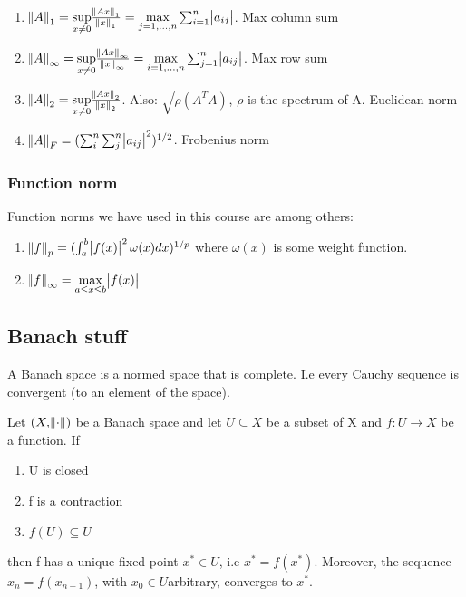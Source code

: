 \documentclass[a4paper, 12pt]{article}
\begin{document}
\begin{myex}
	\begin{enumerate}
		\item $\norm{A}_1 = \underset{x \neq 0}{\sup} \frac{\norm{Ax}_1}{\norm{x}_1} = \underset{j=1,...,n}{\max} \sum_{i=1}^{n}\abs{a_{ij}}$. Max column sum
		\item $\norm{A}_\infty = \underset{x \neq 0}{\sup} \frac{\norm{Ax}_\infty}{\norm{x}_\infty} = \underset{i = 1,...,n}{\max} \sum_{j=1}^{n} \abs{a_{ij}}$. Max row sum
		\item $\norm{A}_2 = \underset{x \neq 0}{\sup} \frac{\norm{Ax}_2}{\norm{x}_2}$. Also: $\sqrt{\rho(A^TA)}$, $\rho$ is the spectrum of A. Euclidean norm
		\item $\norm{A}_F = (\sum_{i}^{n}\sum_{j}^{n}\abs{a_{ij}}^2)^{1/2}$. Frobenius norm
	\end{enumerate}
\end{myex}

\subsubsection{Function norm}

Function norms we have used in this course are among others: \\
\begin{enumerate}
	\item $\norm{f}_p = (\int_{a}^{b} \abs{f(x)}^2\omega (x) dx)^{1/p}$ where $\omega(x)$ is some weight function.
	\item $\norm{f}_\infty = \underset{a \leq x \leq b}{\max} \abs{f(x)}$
\end{enumerate}

\subsection{Banach stuff}
\begin{mydef}
	A Banach space is a normed space that is complete. I.e every Cauchy sequence is convergent (to an element of the space).
\end{mydef}

\begin{mythm}
	Let $(X,\norm{\cdot})$ be a Banach space and let $U \subseteq X $ be a subset of X and $f: U \rightarrow X$ be a function. If 
	\begin{enumerate}[label = (\roman*)]
		\item U is closed
		\item f is a contraction
		\item $f(U) \subseteq U$
	\end{enumerate}
	then f has a unique fixed point $x^* \in U$, i.e $x^* = f(x^*)$. Moreover, the sequence $x_n = f(x_{n-1})$, with $ x_0 \in U$arbitrary, converges to $x^*$. 
\end{mythm}
\end{document}
